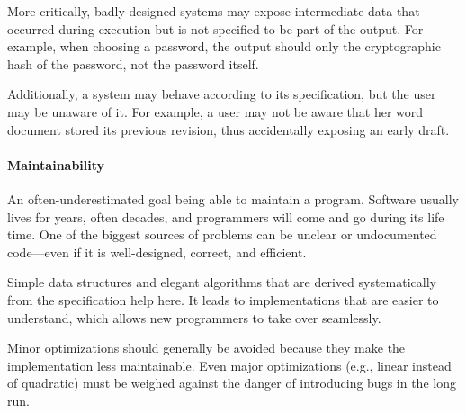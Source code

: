 More critically, badly designed systems may expose intermediate data that occurred during execution but is not specified to be part of the output.
For example, when choosing a password, the output should only the cryptographic hash of the password, not the password itself.

Additionally, a system may behave according to its specification, but the user may be unaware of it.
For example, a user may not be aware that her word document stored its previous revision, thus accidentally exposing an early draft.

\paragraph{Maintainability}
An often-underestimated goal being able to maintain a program.
Software usually lives for years, often decades, and programmers will come and go during its life time.
One of the biggest sources of problems can be unclear or undocumented code---even if it is well-designed, correct, and efficient.

Simple data structures and elegant algorithms that are derived systematically from the specification help here.
It leads to implementations that are easier to understand, which allows new programmers to take over seamlessly.

Minor optimizations should generally be avoided because they make the implementation less maintainable.
Even major optimizations (e.g., linear instead of quadratic) must be weighed against the danger of introducing bugs in the long run.